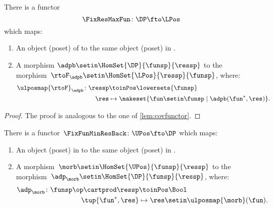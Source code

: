 \begin{lemma}
    \label{lem:confunctor}
    There is a functor
    \begin{equation}
        \FixResMaxFun\colon \DP \fto \LPos
    \end{equation}
    which maps:
    \begin{enumerate}
        \item An object (poset) of \DP to the same object (poset) in \LPos.
        \item A morphism $\adpb \setin \HomSet{\DP}{\funsp}{\ressp}$ to the morphism~$\rtoF_\adpb\setin \HomSet{\LPos}{\ressp}{\funsp}$, where:
              \begin{equation}
                  \begin{aligned}
                      \ulposmap{\rtoF}_\adpb\colon \ressp & \toinPos \lowersets{\funsp} \\
                      \res                                & \mapsto \makeset{ \fun \setin \funsp \mid \adpb(\fun^*,\res)}.
                  \end{aligned}
              \end{equation}
    \end{enumerate}
\end{lemma}

\begin{proof}
    The proof is analogous to the one of \cref{lem:covfunctor}.
\end{proof}

\begin{lemma}
    \label{lem:covfunctorback}
    There is a functor~$\FixFunMinResBack\colon \UPos \fto \DP$ which maps:
    \begin{enumerate}
        \item An object (poset) in \UPos to the same object (poset) in \DP.
        \item A morphism~$\morb\setin \HomSet{\UPos}{\funsp}{\ressp}$ to the morphism~$\adp_\morb \setin \HomSet{\DP}{\funsp}{\ressp}$, where:
              \begin{equation}
                  \begin{aligned}
                      \adp_\morb\colon \funsp\op \cartprod \ressp & \toinPos \Bool \\
                      \tup{\fun^*,\res}                           & \mapsto \res \setin \ulposmap{\morb}(\fun).
                  \end{aligned}
              \end{equation}
    \end{enumerate}
\end{lemma}

